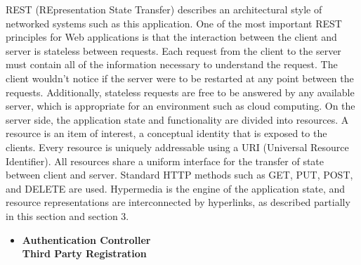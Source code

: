 \begin{legal}
\begin{legal}
				REST (REpresentation State Transfer) describes an architectural style of networked systems such as this application. One of the most important REST principles for Web applications is that the interaction between the client and server is stateless between requests. Each request from the client to the server must contain all of the information necessary to understand the request. The client wouldn't notice if the server were to be restarted at any point between the requests. Additionally, stateless requests are free to be answered by any available server, which is appropriate for an environment such as cloud computing. On the server side, the application state and functionality are divided into resources. A resource is an item of interest, a conceptual identity that is exposed to the clients. Every resource is uniquely addressable using a URI (Universal Resource Identifier). All resources share a uniform interface for the transfer of state between client and server. Standard HTTP methods such as GET, PUT, POST, and DELETE are used. Hypermedia is the engine of the application state, and resource representations are interconnected by hyperlinks, as described partially in this section and section 3.

					\begin{itemize}
						\item \textbf{Authentication Controller} \\
				
						\textbf{Third Party Registration} \\
			

\end{itemize}
\end{legal}
\end{legal}
